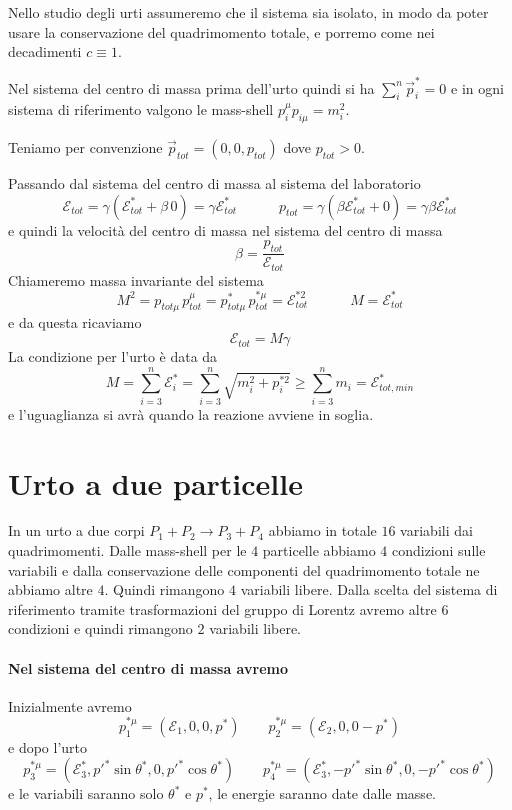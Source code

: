 \documentclass[12pt,a4paper,titlepage, twoside, openright]{book}
\numberwithin{equation}{chapter}
\begin{document}
Nello studio degli urti assumeremo che il sistema sia isolato, in modo da poter usare la conservazione del quadrimomento totale, e porremo come nei decadimenti $c\equiv 1$.

Nel sistema del centro di massa prima dell'urto quindi si ha $\sum_i^n\vec{p}_i^*=0$ e in ogni sistema di riferimento valgono le mass-shell $p_i^\mu p_{i\mu}=m_i^2$.

Teniamo per convenzione $\vec{p}_{tot}=(0,0,p_{tot})$ dove $p_{tot}>0$.

Passando dal sistema del centro di massa al sistema del laboratorio
\[
\mathcal{E}_{tot} = \gamma( \mathcal{E}_{tot}^* + \beta \, 0 ) = \gamma \mathcal{E}_{tot}^* \qquad \quad p_{tot} = \gamma( \beta \mathcal{E}_{tot}^* + 0 ) = \gamma \beta \mathcal{E}^*_{tot}
\]
e quindi la velocità del centro di massa nel sistema del centro di massa
\[
\beta=\dfrac{p_{tot}}{\mathcal{E}_{tot}}
\]
Chiameremo massa invariante del sistema 
\[
M^2=p_{tot\mu}\, p_{tot}^\mu=p_{tot\mu}^*\, p_{tot}^{*\mu}=\mathcal{E}_{tot}^{*2} \qquad \quad M=\mathcal{E}_{tot}^*
\]
e da questa ricaviamo
\[
\mathcal{E}_{tot}=M\gamma
\]
La condizione per l'urto è data da
\[
M=\sum_{i=3}^n\mathcal{E}^*_{i}=\sum_{i=3}^n \sqrt{m_i^2+p_i^{*2}}\geq\sum_{i=3}^n m_i=\mathcal{E}_{tot,min}^*
\]
e l'uguaglianza si avrà quando la reazione avviene in soglia.

\section{Urto a due particelle}

In un urto a due corpi $P_1+P_2\rightarrow P_3+P_4$ abbiamo in totale $16$ variabili dai quadrimomenti. Dalle mass-shell per le $4$ particelle abbiamo $4$ condizioni sulle variabili e dalla conservazione delle componenti del quadrimomento totale ne abbiamo altre $4$. Quindi rimangono $4$ variabili libere. Dalla scelta del sistema di riferimento tramite trasformazioni del gruppo di Lorentz avremo altre $6$ condizioni e quindi rimangono $2$ variabili libere.

\paragraph{Nel sistema del centro di massa avremo}
Inizialmente avremo
\[
p_1^{*\mu}=(\mathcal{E}_1,0,0,p^*) \qquad p_2^{*\mu}=(\mathcal{E}_2,0,0-p^*)
\]
e dopo l'urto
\[
p^{*\mu}_3=(\mathcal{E}_3^*,p'^*\sin{\theta^*},0,p'^*\cos{\theta^*}) \qquad
p^{*\mu}_4=(\mathcal{E}_3^*,-p'^*\sin{\theta^*},0,-p'^*\cos{\theta^*})
\]
e le variabili saranno solo $\theta^*$ e $p^*$, le energie saranno date dalle masse.
\end{document}
